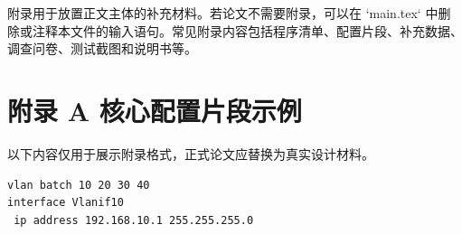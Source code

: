\clearpage
{}

附录用于放置正文主体的补充材料。若论文不需要附录，可以在 `main.tex` 中删除或注释本文件的输入语句。常见附录内容包括程序清单、配置片段、补充数据、调查问卷、测试截图和说明书等。

\section*{附录 A 核心配置片段示例}

以下内容仅用于展示附录格式，正式论文应替换为真实设计材料。

\begin{verbatim}
vlan batch 10 20 30 40
interface Vlanif10
 ip address 192.168.10.1 255.255.255.0
\end{verbatim}
